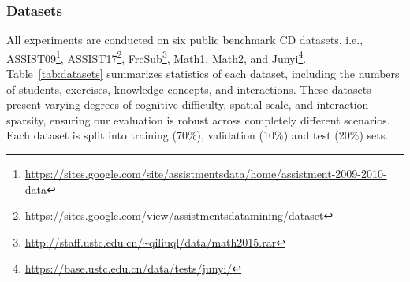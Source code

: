 \documentclass[a4paper,runningheads]{llncs}
\begin{document}
\subsubsection{Datasets}
All experiments are conducted on six public benchmark CD datasets, i.e., ASSIST09\footnote{\url{https://sites.google.com/site/assistmentsdata/home/assistment-2009-2010-data}},
ASSIST17\footnote{\url{https://sites.google.com/view/assistmentsdatamining/dataset}},
FrcSub\footnote{\url{http://staff.ustc.edu.cn/~qiliuql/data/math2015.rar}},
Math1\footnotemark[3], Math2\footnotemark[3], and
Junyi\footnote{\url{https://base.ustc.edu.cn/data/tests/junyi/}}. Table~\ref{tab:datasets} summarizes statistics of each dataset, including the numbers of students, exercises, knowledge concepts, and interactions. These datasets present varying degrees of cognitive difficulty, spatial scale, and interaction sparsity, ensuring our evaluation is robust across completely different scenarios. Each dataset is split into training (70\%), validation (10\%) and test (20\%) sets.


\end{document}
